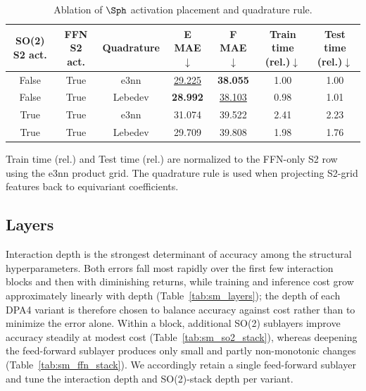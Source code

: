 \begin{table}[ht]
    \centering
    \scriptsize
    \begin{threeparttable}
        \caption{Ablation of $\Sph$ activation placement and quadrature rule.}
        \label{tab:sm_quadrature_ablation}
        \begin{tabular}{@{}ccccccc@{}}
            \toprule
            \textbf{SO(2) S2 act.}                 &
            \textbf{FFN S2 act.}                   &
            \textbf{Quadrature}                    &
            \textbf{E MAE}$\downarrow$             &
            \textbf{F MAE}$\downarrow$             &
            \textbf{Train time (rel.)}$\downarrow$ &
            \textbf{Test time (rel.)}$\downarrow$                                                                           \\
            \midrule
            False                                  & True & e3nn    & \underline{29.225} & \textbf{38.055}    & 1.00 & 1.00 \\
            False                                  & True & Lebedev & \textbf{28.992}    & \underline{38.103} & 0.98 & 1.01 \\
            True                                   & True & e3nn    & 31.074             & 39.522             & 2.41 & 2.23 \\
            True                                   & True & Lebedev & 29.709             & 39.808             & 1.98 & 1.76 \\
            \bottomrule
        \end{tabular}
        \begin{tablenotes}
            \item[a] Train time (rel.) and Test time (rel.) are normalized to the FFN-only S2 row
            using the e3nn product grid. The quadrature rule is used when projecting
            S2-grid features back to equivariant coefficients.
        \end{tablenotes}
    \end{threeparttable}
\end{table}

\FloatBarrier

\subsection{Layers}

Interaction depth is the strongest determinant of accuracy among the structural
hyperparameters. Both errors fall most rapidly over the first few interaction
blocks and then with diminishing returns, while training and inference cost grow
approximately linearly with depth (Table~\ref{tab:sm_layers}); the depth of each
DPA4 variant is therefore chosen to balance accuracy against cost rather than to
minimize the error alone. Within a block, additional SO(2) sublayers improve
accuracy steadily at modest cost (Table~\ref{tab:sm_so2_stack}), whereas
deepening the feed-forward sublayer produces only small and partly non-monotonic
changes (Table~\ref{tab:sm_ffn_stack}). We accordingly retain a single
feed-forward sublayer and tune the interaction depth and SO(2)-stack depth per
variant.

